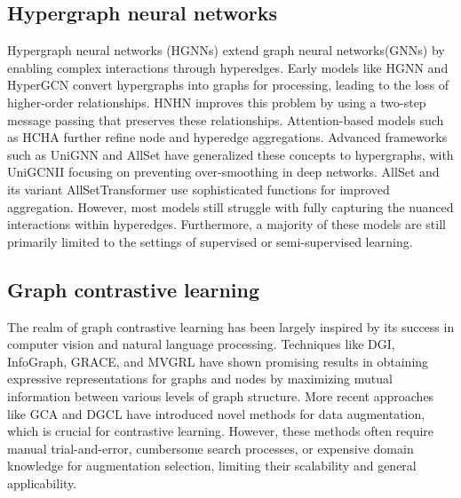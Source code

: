 \subsection{Hypergraph neural networks}

Hypergraph neural networks (HGNNs) extend graph neural networks(GNNs) by enabling complex interactions through hyperedges. Early models like HGNN\cite{feng2019hypergraph} and HyperGCN\cite{yadati2019hypergcn} convert hypergraphs into graphs for processing, leading to the loss of higher-order relationships. HNHN\cite{dong2020hnhn} improves this problem by using a two-step message passing that preserves these relationships. Attention-based models such as HCHA\cite{bai2021hypergraph} further refine node and hyperedge aggregations. Advanced frameworks such as  UniGNN\cite{huangunignn} and AllSet\cite{chien2021you} have generalized these concepts to hypergraphs, with UniGCNII focusing on preventing over-smoothing in deep networks. AllSet and its variant AllSetTransformer use sophisticated functions for improved aggregation. However, most models still struggle with fully capturing the nuanced interactions within hyperedges. Furthermore, a majority of these models are still primarily limited to the settings of supervised or semi-supervised learning.

\subsection{Graph contrastive learning}
The realm of graph contrastive learning has been largely inspired by its success in computer vision and natural language processing. Techniques like DGI\cite{velivckovic2018deep}, InfoGraph\cite{sun2019infograph}, GRACE\cite{zhu2020deep}, and MVGRL\cite{hassani2020contrastive} have shown promising results in obtaining expressive representations for graphs and nodes by maximizing mutual information between various levels of graph structure. More recent approaches like GCA\cite{zhu2021graph} and DGCL\cite{zhao2021graph} have introduced novel methods for data augmentation, which is crucial for contrastive learning. However, these methods often require manual trial-and-error, cumbersome search processes, or expensive domain knowledge for augmentation selection, limiting their scalability and general applicability. 


